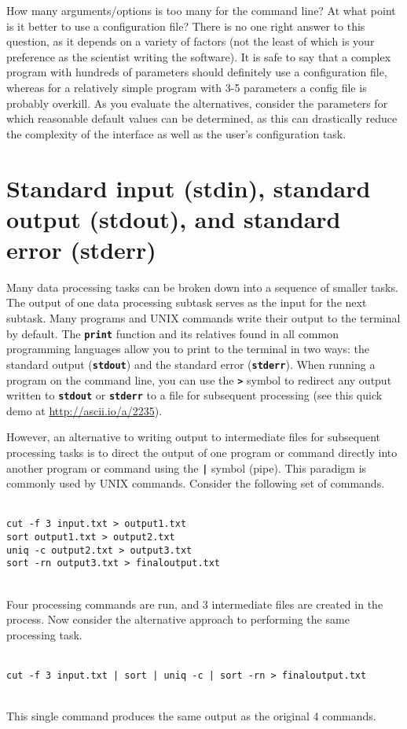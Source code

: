\documentclass{article}
\begin{document}
How many arguments/options is too many for the command line? At what point is it better to use a configuration file? There is no one right answer to this question, as it depends on a variety of factors (not the least of which is your preference as the scientist writing the software). It is safe to say that a complex program with hundreds of parameters should definitely use a configuration file, whereas for a relatively simple program with 3-5 parameters a config file is probably overkill. As you evaluate the alternatives, consider the parameters for which reasonable default values can be determined, as this can drastically reduce the complexity of the interface as well as the user's configuration task.

\section{Standard input (stdin), standard output (stdout), and standard error (stderr)}
Many data processing tasks can be broken down into a sequence of smaller tasks. The output of one data processing subtask serves as the input for the next subtask. Many programs and UNIX commands write their output to the terminal by default. The \texttt{\textbf{print}} function and its relatives found in all common programming languages allow you to print to the terminal in two ways: the standard output (\texttt{\textbf{stdout}}) and the standard error (\texttt{\textbf{stderr}}). When running a program on the command line, you can use the \texttt{\textbf{>}} symbol to redirect any output written to \texttt{\textbf{stdout}} or \texttt{\textbf{stderr}} to a file for subsequent processing (see this quick demo at \url{http://ascii.io/a/2235}).

However, an alternative to writing output to intermediate files for subsequent processing tasks is to direct the output of one program or command directly into another program or command using the \texttt{\textbf{|}} symbol (pipe). This paradigm is commonly used by UNIX commands. Consider the following set of commands.
\\ \\
\begin{verbatim}
cut -f 3 input.txt > output1.txt
sort output1.txt > output2.txt
uniq -c output2.txt > output3.txt
sort -rn output3.txt > finaloutput.txt
\end{verbatim}
\\
Four processing commands are run, and 3 intermediate files are created in the process. Now consider the alternative approach to performing the same processing task.
\\ \\
\begin{verbatim}
cut -f 3 input.txt | sort | uniq -c | sort -rn > finaloutput.txt
\end{verbatim}
\\
This single command produces the same output as the original 4 commands.
\end{document}
